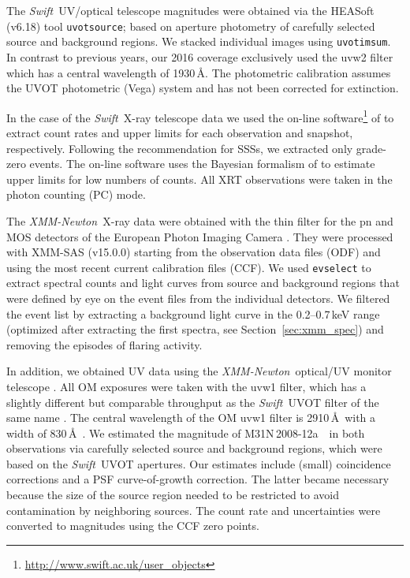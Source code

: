\documentclass[twocolumn,tighten]{aastex6}
\def\swift{{\it Swift~}}
\def\xmm{{\it XMM-Newton~}}
\def\nova{{M31N\,2008-12a~}}
\begin{document}
The \swift UV/optical telescope \citep[UVOT,][]{2005SSRv..120...95R} magnitudes were obtained via the HEASoft (v6.18) tool \texttt{uvotsource}; based on aperture photometry of carefully selected source and background regions. We stacked individual images using \texttt{uvotimsum}. In contrast to previous years, our 2016 coverage exclusively used the uvw2 filter which has a central wavelength of 1930\,\AA. The photometric calibration assumes the UVOT photometric (Vega) system \citep{2008MNRAS.383..627P,2011AIPC.1358..373B} and has not been corrected for extinction. 

In the case of the \swift X-ray telescope \citep[XRT;][]{2005SSRv..120..165B} data we used the on-line software\footnote{\url{http://www.swift.ac.uk/user\_objects}} of \citet{2009MNRAS.397.1177E} to extract count rates and upper limits for each observation and snapshot, respectively. Following the recommendation for SSSs, we extracted only grade-zero events. The on-line software uses the Bayesian formalism of \citet{1991ApJ...374..344K} to estimate upper limits for low numbers of counts. All XRT observations were taken in the photon counting (PC) mode.

The \xmm X-ray data were obtained with the thin filter for the pn and MOS detectors of the European Photon Imaging Camera \citep[EPIC;][]{2001A&A...365L..18S,2001A&A...365L..27T}. They were processed with XMM-SAS (v15.0.0) starting from the observation data files (ODF) and using the most recent current calibration files (CCF). We used \texttt{evselect} to extract spectral counts and light curves from source and background regions that were defined by eye on the event files from the individual detectors. We filtered the event list by extracting a background light curve in the 0.2--0.7\,keV range (optimized after extracting the first spectra, see Section~\ref{sec:xmm_spec}) and removing the episodes of flaring activity.

In addition, we obtained UV data using the \xmm optical/UV monitor telescope \citep[OM;][]{2001A&A...365L..36M}. All OM exposures were taken with the uvw1 filter, which has a slightly different but comparable throughput as the \swift UVOT filter of the same name \citep[cf.][]{2005SSRv..120...95R}. The central wavelength of the OM uvw1 filter is 2910\,\AA\ with a width of 830\,\AA\ \citep[cf.\ UVOT uvw1:\ central wavelength 2600\,\AA, width 693\,\AA; see][]{2008MNRAS.383..627P}. We estimated the magnitude of \nova\ in both observations via carefully selected source and background regions, which were based on the \swift UVOT apertures. Our estimates include (small) coincidence corrections and a PSF curve-of-growth correction. The latter became necessary because the size of the source region needed to be restricted to avoid contamination by neighboring sources. The count rate and uncertainties were converted to magnitudes using the CCF zero points.
\end{document}
